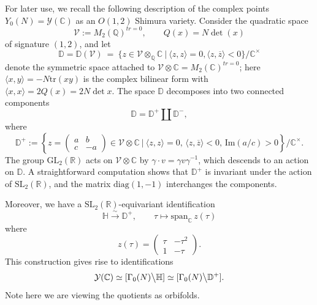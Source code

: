 \documentclass[reqno,oneside]{amsart}
\theoremstyle{plain}
\theoremstyle{remark}
\numberwithin{theorem}{section}
\newcommand{\bbC}{\mathbb C}
\newcommand{\bbD}{\mathbb D}
\newcommand{\bbH}{\mathbb H}
\newcommand{\bbQ}{\mathbb Q}
\newcommand{\bbR}{\mathbb R}
\newcommand{\calV}{\mathcal V}
\newcommand{\calY}{\mathcal Y}
\newcommand{\psm}[1]{\left( \begin{smallmatrix}#1 \end{smallmatrix} \right)}
\newcommand{\GL}{\mathrm{GL}}
\begin{document}
	For later use, we recall the following description of the complex points $Y_0(N) = \calY(\bbC)$ as an $O(1,2)$  Shimura variety.	Consider the quadratic space
	\begin{equation} \label{eqn:calV defn}
	\calV := M_2(\bbQ)^{tr = 0}, \qquad Q(x) = N \det(x)
	\end{equation} 	
	of signature $(1,2)$, and  let
	\begin{equation}
	\bbD = \bbD(\calV) \ = \ \{ z \in \calV\otimes_{\bbQ}\bbC \ | \ \langle z, z \rangle = 0, \langle z, \overline z \rangle < 0  \} \big/ \bbC^{\times}
	\end{equation}
	denote the symmetric space attached to $\calV \otimes \bbC = M_2(\bbC)^{tr=0}$; here $\langle x, y \rangle = -N \mathrm{tr}(x y)$ is the complex bilinear form with $\langle x, x \rangle = 2 Q(x) = 2N\det x$. The space $\mathbb D$ decomposes into two connected components
	\begin{equation}
	\bbD = \bbD^+ \coprod \bbD^-,
	\end{equation}
	where
	\begin{equation}
	\bbD^+  := \left\{  z = \psm{ a& b \\ c & -a } \in \calV \otimes \bbC \ | \ \langle z, z \rangle = 0, \, \langle z, \overline z \rangle < 0 , \, \mathrm{Im}(a/c) > 0  \right\} \big/ \bbC^{\times}.
	\end{equation}
	The group $\GL_2(\bbR)$ acts on $\calV \otimes \bbC$ by $\gamma \cdot v = \gamma v \gamma^{-1}$, which descends to an action on $\bbD$. A straightforward computation shows that $\bbD^+$ is invariant under the action of $\mathrm{SL}_2(\bbR)$, and the matrix $\mathrm{diag}(1,-1)$ interchanges the components.
	
	Moreover, we have a $\mathrm{SL}_2(\bbR)$-equivariant identification
	\begin{equation} \label{eqn:upper half plane sym space isom}
	\bbH  \stackrel{\sim}{\longrightarrow} \bbD^+, \qquad \tau \mapsto \mathrm{span}_{\bbC} \, z(\tau)
	\end{equation}
	where
	\begin{equation}
	z(\tau) = \begin{pmatrix}\tau  & -\tau^2 \\ 1 & - \tau \end{pmatrix} .
	\end{equation}
	This construction gives rise to identifications
	\begin{equation}
	\calY(\bbC) \simeq [\Gamma_0(N) \big\backslash \bbH] \simeq [\Gamma_0(N) \big \backslash \bbD^+].
	\end{equation}
	Note here we are viewing the quotients as orbifolds.
	
\end{document}
